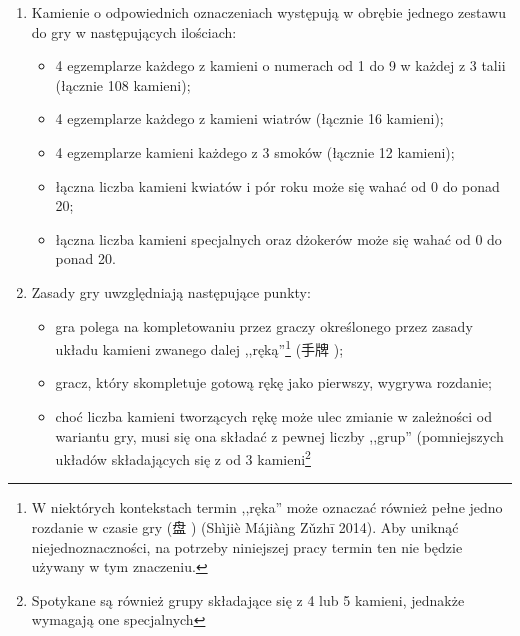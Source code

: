 \begin{enumerate}[label={\alph*)}]
\begin{itemize}
{	  Chińczycy używają określenia ,,3 '' (三元牌 ). We wczesnych zestawach do gry w madżonga występował jednakże
	  kamień oznaczany znakiem smoka -- 龍\footnotemark[2].} (龍\footnotemark[2]
	  ), a zamiast smoka czerwonego -- feniks (鳳\footnotemark[2] );
	  \item opcjonalnie kwiaty i/lub pory roku w różnej ilości;
	  \item opcjonalnie dżoker lub inne kamienie specjalne.
	\end{itemize}
\item Kamienie o odpowiednich oznaczeniach występują w obrębie jednego zestawu
do gry w następujących ilościach:
	\begin{itemize}
	  \item 4 egzemplarze każdego z kamieni o numerach od 1 do 9 w każdej z 3 talii
	  (łącznie 108 kamieni);
	  \item 4 egzemplarze każdego z kamieni wiatrów (łącznie 16 kamieni);
	  \item 4 egzemplarze kamieni każdego z 3 smoków (łącznie 12 kamieni);
	  \item łączna liczba kamieni kwiatów i pór roku może się wahać od 0 do ponad
	  20;
	  \item łączna liczba kamieni specjalnych oraz dżokerów może się wahać od
	0 do ponad 20.
	\end{itemize} 
\item Zasady gry uwzględniają następujące punkty:
	\begin{itemize}
	  \item gra polega na kompletowaniu przez graczy określonego przez zasady
	  układu kamieni zwanego dalej ,,ręką''\footnote{\label{reka}W niektórych
	  kontekstach termin ,,ręka'' może oznaczać również pełne jedno rozdanie w czasie gry (盘
	  ) (Shìjiè Májiàng Zǔzhī 2014). Aby uniknąć niejednoznaczności,
	  na potrzeby niniejszej pracy termin ten nie będzie używany w tym znaczeniu.}
	  (手牌 );
	  \item gracz, który skompletuje gotową rękę jako pierwszy, wygrywa rozdanie;
	  \item choć liczba kamieni tworzących rękę może ulec zmianie w zależności od
	  wariantu gry, musi się ona składać z pewnej liczby ,,grup'' (pomniejszych
	  układów składających się z od 3 kamieni\footnote{Spotykane są również grupy
	  składające się z 4 lub 5 kamieni, jednakże wymagają one specjalnych
}
\end{itemize}
\end{enumerate}
